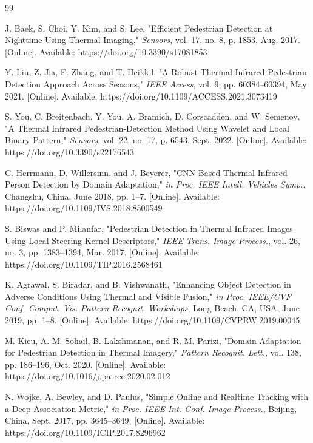 \documentclass[conference]{IEEEtran}
\begin{document}
\begin{thebibliography}{99}

J. Baek, S. Choi, Y. Kim, and S. Lee,
"Efficient Pedestrian Detection at Nighttime Using Thermal Imaging,"
\textit{Sensors}, vol. 17, no. 8, p. 1853, Aug. 2017.
[Online]. Available: https://doi.org/10.3390/s17081853

Y. Liu, Z. Jia, F. Zhang, and T. Heikkil,
"A Robust Thermal Infrared Pedestrian Detection Approach Across Seasons,"
\textit{IEEE Access}, vol. 9, pp. 60384--60394, May 2021.
[Online]. Available: https://doi.org/10.1109/ACCESS.2021.3073419

S. You, C. Breitenbach, Y. You, A. Bramich, D. Corscadden, and W. Semenov,
"A Thermal Infrared Pedestrian-Detection Method Using Wavelet and Local Binary Pattern,"
\textit{Sensors}, vol. 22, no. 17, p. 6543, Sept. 2022.
[Online]. Available: https://doi.org/10.3390/s22176543

C. Herrmann, D. Willersinn, and J. Beyerer,
"CNN-Based Thermal Infrared Person Detection by Domain Adaptation,"
\textit{in Proc. IEEE Intell. Vehicles Symp.}, Changshu, China, June 2018, pp. 1--7.
[Online]. Available: https://doi.org/10.1109/IVS.2018.8500549

S. Biswas and P. Milanfar,
"Pedestrian Detection in Thermal Infrared Images Using Local Steering Kernel Descriptors,"
\textit{IEEE Trans. Image Process.}, vol. 26, no. 3, pp. 1383--1394, Mar. 2017.
[Online]. Available: https://doi.org/10.1109/TIP.2016.2568461

K. Agrawal, S. Biradar, and B. Vishwanath,
"Enhancing Object Detection in Adverse Conditions Using Thermal and Visible Fusion,"
\textit{in Proc. IEEE/CVF Conf. Comput. Vis. Pattern Recognit. Workshops}, Long Beach, CA, USA, June 2019, pp. 1--8.
[Online]. Available: https://doi.org/10.1109/CVPRW.2019.00045

M. Kieu, A. M. Sohail, B. Lakshmanan, and R. M. Parizi,
"Domain Adaptation for Pedestrian Detection in Thermal Imagery,"
\textit{Pattern Recognit. Lett.}, vol. 138, pp. 186--196, Oct. 2020.
[Online]. Available: https://doi.org/10.1016/j.patrec.2020.02.012

N. Wojke, A. Bewley, and D. Paulus,
"Simple Online and Realtime Tracking with a Deep Association Metric,"
\textit{in Proc. IEEE Int. Conf. Image Process.}, Beijing, China, Sept. 2017, pp. 3645--3649.
[Online]. Available: https://doi.org/10.1109/ICIP.2017.8296962


\end{thebibliography}
\end{document}
